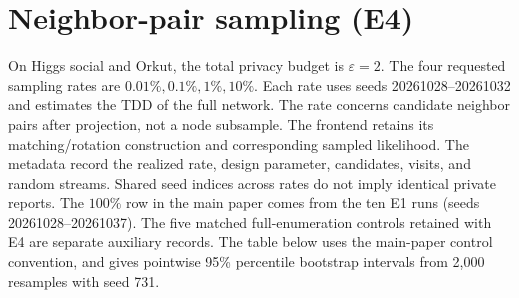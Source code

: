 \clearpage
\section{Neighbor-pair sampling (E4)}
On Higgs social and Orkut, the total privacy budget is $\varepsilon=2$.
The four requested sampling rates are $0.01\%,0.1\%,1\%,10\%$.
Each rate uses seeds 20261028--20261032 and estimates the TDD of the full network.
The rate concerns candidate neighbor pairs after projection, not a node subsample.
The frontend retains its matching/rotation construction and corresponding sampled likelihood.
The metadata record the realized rate, design parameter, candidates, visits, and random streams.
Shared seed indices across rates do not imply identical private reports.
The $100\%$ row in the main paper comes from the ten E1 runs (seeds 20261028--20261037).
The five matched full-enumeration controls retained with E4 are separate auxiliary records.
The table below uses the main-paper control convention, and gives pointwise 95\% percentile
bootstrap intervals from 2,000 resamples with seed 731.
\begingroup\fontsize{8.3}{10}\selectfont\setlength{\tabcolsep}{3pt}
